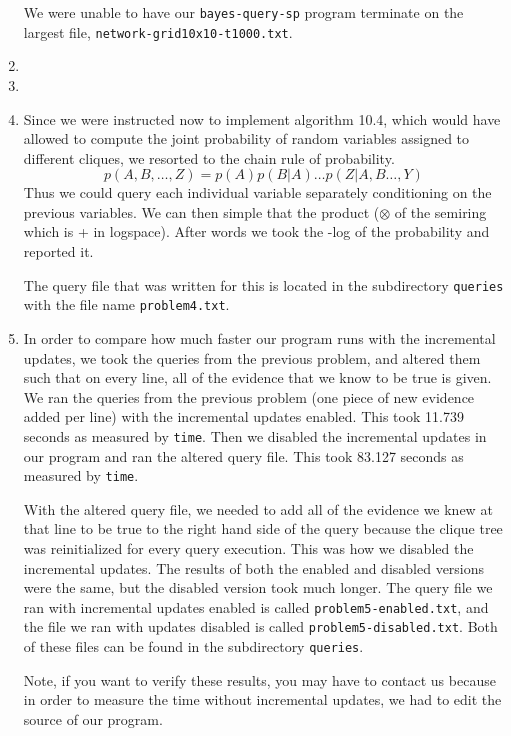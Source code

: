 \documentclass[11pt,a4paper]{article}
\begin{document}
\begin{enumerate}
		We were unable to have our {\tt bayes-query-sp} program terminate on the largest file,
		{\tt network-grid10x10-t1000.txt}.
		
		\item
		\item
		\item Since we were instructed now to implement algorithm 10.4, which would have allowed to compute the joint probability of random variables assigned to different cliques, we resorted to the chain rule of probability. 
		$$
		p(A,B,\ldots,Z) = p(A)p(B|A)\ldots p(Z|A,B\ldots,Y)
		$$
		Thus we could query each individual variable separately conditioning on the previous 
		variables. We can then simple that the product ($\otimes$ of the semiring which is + 
		in logspace). After words we took the -log of the probability and reported it. 
		
		The query file that was written for this is located in the subdirectory {\tt queries}
		with the file name {\tt problem4.txt}.
		
		\item In order to compare how much faster our program runs with the incremental
		updates, we took the queries from the previous problem, and altered them such that
		on every line, all of the evidence that we know to be true is given. We ran the queries
		from the previous problem (one piece of new evidence added per line) with the 
		incremental updates enabled. This took 11.739 seconds as measured by {\tt time}.
		Then we disabled the incremental updates in our program and ran the altered
		query file. This took 83.127 seconds as measured by {\tt time}. 
		
		With the altered query file, we needed to add all of the evidence we knew at that
		line to be true to the right hand side of the query because the clique tree was
		reinitialized for every query execution. This was how we disabled the incremental
		updates. The results of both the enabled and disabled versions were the same, but
		the disabled version took much longer. The query file we ran with incremental
		updates enabled is called {\tt problem5-enabled.txt}, and the file we ran with
		updates disabled is called {\tt problem5-disabled.txt}. Both of these files can be
		found in the subdirectory {\tt queries}. 
		
		Note, if you want to verify these results, you may have to contact us because
		in order to measure the time without incremental updates, we had to edit the
		source of our program.
		

\end{enumerate}
\end{document}
